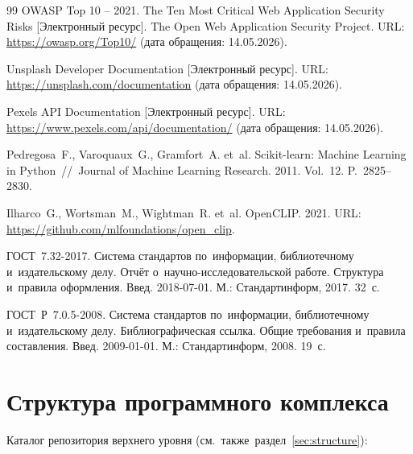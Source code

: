 \documentclass[a4paper,12pt]{diplom}
\begin{document}
\begin{thebibliography}{99}
OWASP Top 10 -- 2021. The Ten Most Critical Web Application Security Risks [Электронный ресурс]. The Open Web Application Security Project. URL: \url{https://owasp.org/Top10/} (дата обращения: 14.05.2026).

Unsplash Developer Documentation [Электронный ресурс]. URL: \url{https://unsplash.com/documentation} (дата обращения: 14.05.2026).

Pexels API Documentation [Электронный ресурс]. URL: \url{https://www.pexels.com/api/documentation/} (дата обращения: 14.05.2026).

Pedregosa~F., Varoquaux~G., Gramfort~A. et~al. Scikit-learn: Machine Learning in Python~//~Journal of Machine Learning Research. 2011. Vol.~12. P.~2825--2830.

Ilharco~G., Wortsman~M., Wightman~R. et~al. OpenCLIP. 2021. URL: \url{https://github.com/mlfoundations/open_clip}.

ГОСТ~7.32-2017. Система стандартов по~информации, библиотечному и~издательскому делу. Отчёт о~научно-исследовательской работе. Структура и~правила оформления. Введ. 2018-07-01. М.: Стандартинформ, 2017. 32~с.

ГОСТ~Р~7.0.5-2008. Система стандартов по~информации, библиотечному и~издательскому делу. Библиографическая ссылка. Общие требования и~правила составления. Введ. 2009-01-01. М.: Стандартинформ, 2008. 19~с.

\end{thebibliography}

\appendix

\lstset{
  tabsize=4,
  formfeed=\newpage,
  extendedchars=true,
  basicstyle=\ttfamily\footnotesize,
  commentstyle=\rmfamily\itshape,
  stringstyle=\slshape,
  numbers=left,
  numbersep=1em,
  stepnumber=1,
  numberstyle=\footnotesize,
}

\chapter{Структура программного комплекса}
\label{app:structure}

Каталог репозитория верхнего уровня (см.~также~раздел~\ref{sec:structure}):
\end{document}
